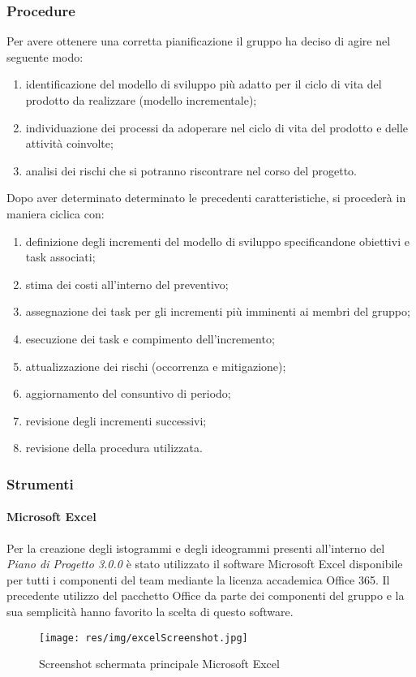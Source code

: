 \subsubsection{Procedure}
Per avere ottenere una corretta pianificazione il gruppo ha deciso di agire nel seguente modo:
\begin{enumerate}
	\item identificazione del modello di sviluppo più adatto per il ciclo di vita del prodotto da realizzare (modello incrementale);
	\item individuazione dei processi da adoperare nel ciclo di vita del prodotto e delle attività coinvolte;
	\item analisi dei rischi che si potranno riscontrare nel corso del progetto.
\end{enumerate}
Dopo aver determinato determinato le precedenti caratteristiche, si procederà in maniera ciclica con:
\begin{enumerate}
	\item definizione degli incrementi del modello di sviluppo specificandone obiettivi e task associati;
	\item stima dei costi all'interno del preventivo;
	\item assegnazione dei task per gli incrementi più imminenti ai membri del gruppo;
	\item esecuzione dei task e compimento dell'incremento;
	\item attualizzazione dei rischi (occorrenza e mitigazione);
	\item aggiornamento del consuntivo di periodo;
	\item revisione degli incrementi successivi;
	\item revisione della procedura utilizzata.
\end{enumerate}



\subsubsection{Strumenti}
\paragraph{Microsoft Excel}
Per la creazione degli istogrammi e degli ideogrammi presenti all'interno del \textit{Piano di Progetto 3.0.0\doc} è stato utilizzato il software Microsoft Excel disponibile per tutti i componenti del team mediante la licenza accademica Office 365. Il precedente utilizzo del pacchetto Office da parte dei componenti del gruppo e la sua semplicità hanno favorito la scelta di questo software.
\begin{figure}[h!]
	\caption{Screenshot schermata principale Microsoft Excel}
	\centering
	\texttt{[image: res/img/excelScreenshot.jpg]}
\end{figure}
\newpage
